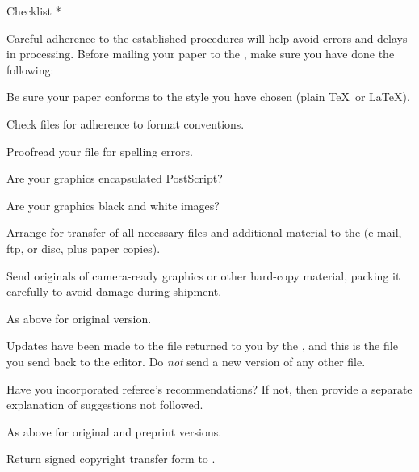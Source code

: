 \head * Checklist *

Careful adherence to the established procedures will help avoid errors
and delays in processing.  Before mailing your paper to the \editor,
make sure you have done the following:

\medskip
{}
\list[\tag{\bull}]
\item Be sure your paper conforms to the style you have chosen (plain
 \TeX\ or \LaTeX).
\item Check files for adherence to format conventions.
\item Proofread your file for spelling errors.
\item Are your graphics encapsulated PostScript?
\item Are your graphics black and white images?
\item Arrange for transfer of all necessary files and additional
 material to the \editor{} (e-mail, ftp, or disc, plus paper copies).
\item Send originals of camera-ready graphics or other hard-copy material,
      packing it carefully to avoid damage during shipment.
\endlist
\medskip
{}
\list[\tag{\bull}]
\item As above for original version.
\item Updates have been made to the file returned to you by the
 \editor, and this is the file you send back to the editor.  Do
 {\it not\/} send a new version of any other file.
\item Have you incorporated referee's recommendations?  If not, then
 provide a separate explanation of suggestions not followed.
\endlist
\medskip
{}
\list[\tag{\bull}]
\item As above for original and preprint versions.
\item Return signed copyright transfer form to \editor.
\endlist

\endarticle

%

